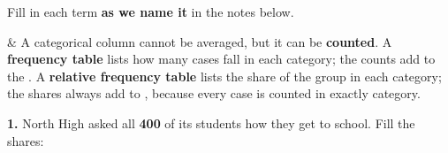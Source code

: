 \documentclass[12pt]{article}
\begin{document}

\vspace{2pt}

\boxguard[16]
\begin{vocabbox}
\small
Fill in each term \textbf{as we name it} in the notes below.
\par
{}
\par
{}
\par
{}
\par
{}
\par
\end{vocabbox}

\small
\begin{guidednotes}
 &
A categorical column cannot be averaged, but it can be \textbf{counted}. A \textbf{frequency
table} lists how many cases fall in each category; the counts add to the \blank{2.2cm}.
A \textbf{relative frequency table} lists the share of the group in each category; the shares
always add to \blank{2.3cm}, because every case is counted in exactly \blank{1.1cm} category.

\vspace{2pt}
\textbf{1.} North High asked all \textbf{400} of its students how they get to school. Fill the
shares:


\end{guidednotes}
\end{document}
